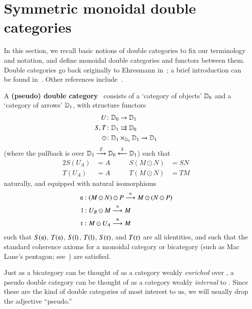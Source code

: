 \section{Symmetric monoidal double categories}
\label{sec:symm-mono-double}

In this section, we recall basic notions of double categories to fix our terminology and notation, and define monoidal double categories and functors between them.
Double categories go back originally to Ehresmann
in~\cite{ehresmann:cat-str}; a brief introduction can be found
in~\cite{ks:r2cats}.  Other references
include~\cite{multi_funct_i,gp:double-limits,gp:double-adjoints}.


\begin{defn}\label{def:dblcat}
  A \textbf{(pseudo) double category} \lD\ consists of a `category of
  objects' $\lD_0$ and a `category of arrows' $\lD_1$, with structure
  functors
  \begin{align*}
    U&\maps \lD_0\to \lD_1\\
    S,T&\maps \lD_1\rightrightarrows \lD_0\\
    \odot&\maps \lD_1\times_{\lD_0}\lD_1\to \lD_1
  \end{align*}
  (where the pullback is over
  $\lD_1\too[T]\lD_0\overset{S}{\longleftarrow} \lD_1$) such that
  \begin{alignat*}{2}
    S(U_A) &= A &\qquad
    S(M\odot N) &= SN\\
    T(U_A) &= A &\qquad
    T(M\odot N) &= TM
  \end{alignat*}
  naturally, and equipped with natural isomorphisms
  \begin{align*}
    \fa &: (M\odot N) \odot P \too[\iso] M \odot (N \odot P)\\
    \fl &: U_B \odot M \too[\iso] M\\
    \fr &: M \odot U_A \too[\iso] M
  \end{align*}
  such that $S(\fa)$, $T(\fa)$, $S(\fl)$, $T(\fl)$, $S(\fr)$, and
  $T(\fr)$ are all identities, and such that the standard coherence
  axioms for a monoidal category or bicategory (such as Mac Lane's
  pentagon; see~\cite{maclane}) are satisfied.
\end{defn}

Just as a bicategory can be thought of as a category weakly
\emph{enriched} over \cCat, a pseudo double category can be thought of
as a category weakly \emph{internal} to \cCat.  Since these are the
kind of double categories of most interest to us, we will usually drop
the adjective ``pseudo.''


